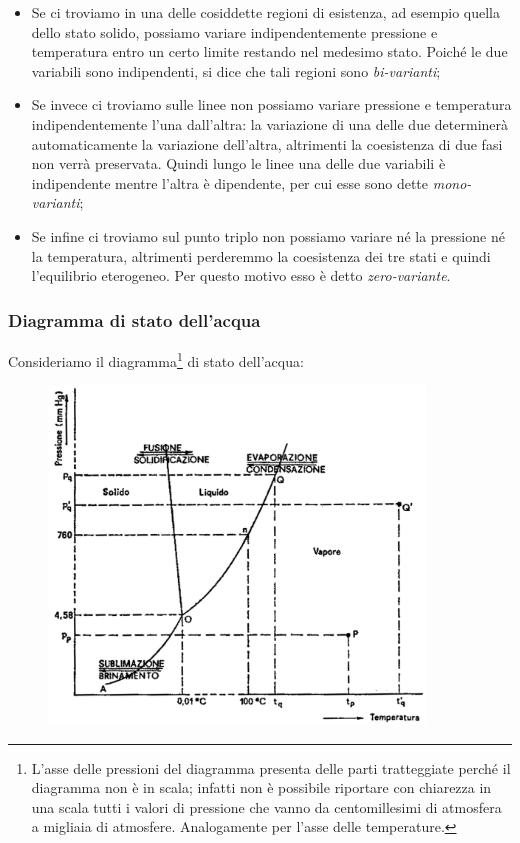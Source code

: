 \begin{itemize}
    \item Se ci troviamo in una delle cosiddette regioni di esistenza, ad esempio quella dello stato solido, possiamo variare indipendentemente pressione e temperatura entro un certo limite restando nel medesimo stato. Poiché le due variabili sono indipendenti, si dice che tali regioni sono \textit{bi-varianti};
    \item Se invece ci troviamo sulle linee non possiamo variare pressione e temperatura indipendentemente l'una dall'altra: la variazione di una delle due determinerà automaticamente la variazione dell'altra, altrimenti la coesistenza di due fasi non verrà preservata. Quindi lungo le linee una delle due variabili è indipendente mentre l'altra è dipendente, per cui esse sono dette \textit{mono-varianti};
    \item Se infine ci troviamo sul punto triplo non possiamo variare né la pressione né la temperatura, altrimenti perderemmo la coesistenza dei tre stati e quindi l'equilibrio eterogeneo. Per questo motivo esso è detto \textit{zero-variante}.
\end{itemize}

\subsubsection{Diagramma di stato dell'acqua}
Consideriamo il diagramma\footnote{L'asse delle pressioni del diagramma presenta delle parti tratteggiate perché il diagramma non è in scala; infatti non è possibile riportare con chiarezza in una scala tutti i valori di pressione che vanno da centomillesimi di atmosfera a migliaia di atmosfere. Analogamente per l'asse delle temperature.} di stato dell'acqua:

\begin{figure}[H]
    \centering
    \includegraphics[width=10cm]{immagini/diagramma_di_stato_acqua.png}
\end{figure}

